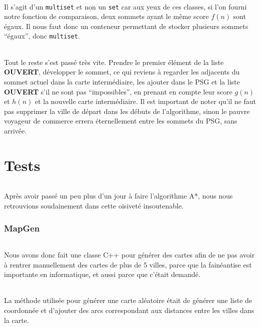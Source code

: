 \documentclass[french]{article}
\begin{document}
\paragraph{} Il s'agit d'un \texttt{multiset} et non un \texttt{set} car aux
yeux de ces classes, si l'on fourni notre fonction de comparaison, deux sommets
ayant le même score $f(n)$ sont égaux. Il nous faut donc un conteneur
permettant de stocker plusieurs sommets ``égaux'', donc \texttt{multiset}.

\paragraph{} Tout le reste s'est passé très vite. Prendre le premier élément de
la liste \textbf{\huge{OUVERT}}, développer le sommet, ce qui reviens à
regarder les adjacents du sommet actuel dans la carte intermédiaire, les
ajouter dans le PSG et la liste \textbf{\Huge{OUVERT}} s'il ne sont pas
``impossibles'', en prenant en compte leur score $g(n)$ et $h(n)$ et la
nouvelle carte intermédiaire. Il est important de noter qu'il ne faut pas
supprimer la ville de départ dans les débuts de l'algorithme, sinon le pauvre
voyageur de commerce errera éternellement entre les sommets du PSG, sans
arrivée.

\part{Tests}

\paragraph{} Après avoir passé un peu plus d'un jour à faire l'algorithme A*,
nous nous retrouvions soudainement dans cette oisiveté insoutenable.

\section{MapGen}

\paragraph{} Nous avons donc fait une classe C++ pour générer des cartes afin
de ne pas avoir à rentrer manuellement des cartes de plus de 5 villes, parce
que la fainéantise est importante en informatique, et aussi parce que c'était
demandé.

\paragraph{} La méthode utilisée pour générer une carte aléatoire était de
générer une liste de coordonnée et d'ajouter des arcs correspondant aux
distances entre les villes dans la carte.
\end{document}
